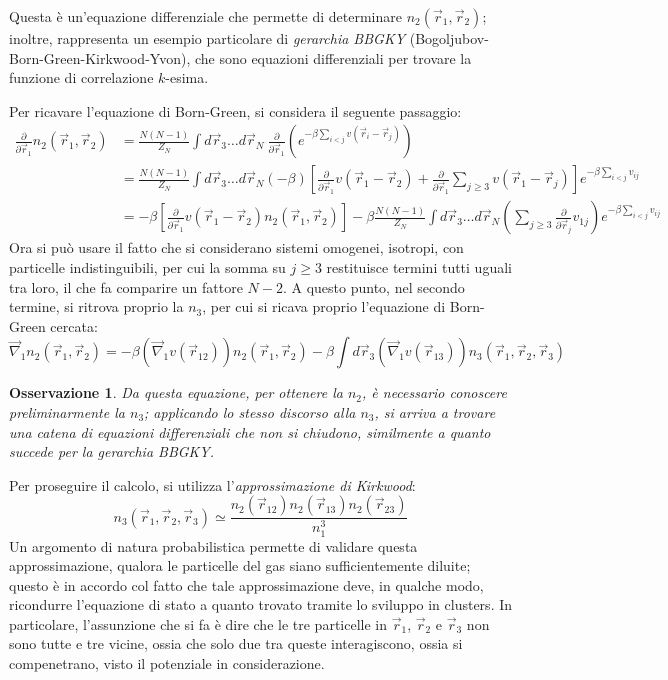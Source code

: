 \documentclass[11pt, a4paper]{scrartcl}
\theoremstyle{style}
\newtheorem{osservazione}{Osservazione}[section]
\theoremstyle{style1}
\numberwithin{equation}{subsection}
\begin{document}
Questa \`e un'equazione differenziale che permette di determinare $n_2(\vec{r}_1,\vec{r}_2)$; inoltre, rappresenta un esempio particolare di \textit{gerarchia BBGKY} (Bogoljubov-Born-Green-Kirkwood-Yvon), che sono equazioni differenziali per trovare la funzione di correlazione $k$-esima.

Per ricavare l'equazione di Born-Green, si considera il seguente passaggio:
\[
\begin{split}
	\frac{\partial }{\partial \vec{r}_1} n_2(\vec{r}_1,\vec{r}_2) &= \frac{N(N-1)}{Z_N} \int d\vec{r}_3 \ldots d\vec{r}_N \ \frac{\partial }{\partial \vec{r}_1} \left( e ^{-\beta \sum_{i<j}^{} v(\vec{r}_i -\vec{r}_j)}\right) \\
								      &= \frac{N(N-1)}{Z_N} \int d\vec{r}_3 \ldots d\vec{r}_N (-\beta ) \left[ \frac{\partial }{\partial \vec{r}_1} v(\vec{r}_1 - \vec{r}_2) + \frac{\partial }{\partial \vec{r}_1} \sum_{j\ge 3}^{} v(\vec{r}_1 -\vec{r}_j) \right]  e^{-\beta \sum_{i<j}^{} v_{ij} }\\
								      &= -\beta  \left[ \frac{\partial }{\partial \vec{r}_1} v(\vec{r}_1 -\vec{r}_2) n_2(\vec{r}_1, \vec{r}_2) \right] - \beta \frac{N(N-1)}{Z_N}\int d\vec{r}_3 \ldots d\vec{r}_N \left(\sum_{j\ge 3}^{} \frac{\partial }{\partial \vec{r}_j} v_{1j} \right) e^{-\beta \sum_{i<j}^{} v_{ij} }
\end{split}
\] 
Ora si pu\`o usare il fatto che si considerano sistemi omogenei, isotropi, con particelle indistinguibili, per cui la somma su $j\ge 3$ restituisce termini tutti uguali tra loro, il che fa comparire un fattore $N-2$. 
A questo punto, nel secondo termine, si ritrova proprio la $n_3$, per cui si ricava proprio l'equazione di Born-Green cercata:
\begin{equation}
	\vec{\nabla }_1 n_2 (\vec{r}_1 , \vec{r}_2) = -\beta \left(\vec{\nabla }_1 v(\vec{r}_{12} )\right) n_2(\vec{r}_1, \vec{r}_2) - \beta \int d\vec{r}_3 \left(\vec{\nabla }_1 v(\vec{r}_{13} )\right) n_3(\vec{r}_1,\vec{r}_2,\vec{r}_3)
\end{equation}
\begin{osservazione}
Da questa equazione, per ottenere la $n_2$, \`e necessario conoscere preliminarmente la $n_3$; applicando lo stesso discorso alla $n_3$, si arriva a trovare una catena di equazioni differenziali che non si chiudono, similmente a quanto succede per la gerarchia BBGKY.
\end{osservazione}
\noindent Per proseguire il calcolo, si utilizza l'\textit{approssimazione di Kirkwood}:
\begin{equation}
	n_3 ( \vec{r}_1, \vec{r}_2, \vec{r}_3) \simeq \frac{n_2(\vec{r}_{12}) n_2(\vec{r}_{13}) n_2(\vec{r}_{23} ) }{n_1^3}
\end{equation}
Un argomento di natura probabilistica permette di validare questa approssimazione, qualora le particelle del gas siano sufficientemente diluite; questo \`e in accordo col fatto che tale approssimazione deve, in qualche modo, ricondurre l'equazione di stato a quanto trovato tramite lo sviluppo in clusters.
In particolare, l'assunzione che si fa \`e dire che le tre particelle in $\vec{r}_1$, $\vec{r}_2$ e $\vec{r}_3$ non sono tutte e tre vicine, ossia che solo due tra queste interagiscono, ossia si compenetrano, visto il potenziale in considerazione.
\end{document}
